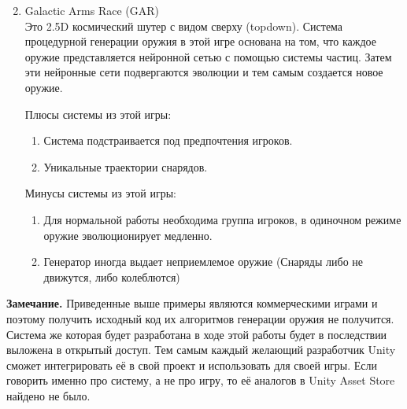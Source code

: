 \begin{enumerate}
    \setcounter{enumi}{1}
    \item Galactic Arms Race (GAR)\cite{s15}\\ Это 2.5D космический шутер с видом сверху (topdown). Система процедурной генерации оружия в этой игре основана на том, что каждое оружие представляется нейронной сетью с помощью системы частиц. Затем эти нейронные сети подвергаются эволюции и тем самым создается новое оружие.

    Плюсы системы из этой игры:
    \begin{enumerate}[--]
        \item Система подстраивается под предпочтения игроков.
        \item Уникальные траектории снарядов.
    \end{enumerate}

    Минусы системы из этой игры:
    \begin{enumerate}[--]
        \item Для нормальной работы необходима группа игроков, в одиночном режиме оружие эволюционирует медленно.
        \item Генератор иногда выдает неприемлемое оружие (Снаряды либо не движутся, либо колеблются)
    \end{enumerate}
\end{enumerate}

\textbf{Замечание.} Приведенные выше примеры являются коммерческими играми и поэтому получить исходный код их алгоритмов генерации оружия не получится. Система же которая будет разработана в ходе этой работы будет в последствии выложена в открытый доступ. Тем самым каждый желающий разработчик Unity сможет интегрировать её в свой проект и использовать для своей игры. Если говорить именно про систему, а не про игру, то её аналогов в Unity Asset Store найдено не было.





